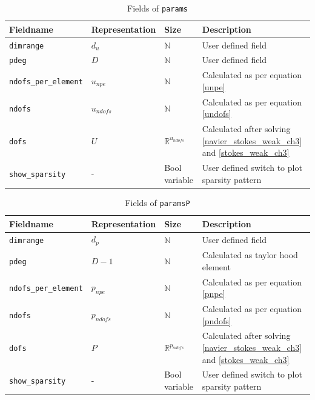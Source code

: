 \documentclass[a4paper,openany]{book}
\begin{document}
\begin{table}
\cprotect\caption{Fields of \verb|params|}
\label{table_params}
\begin{center}
\begin{tabular}{| p{}| p{} |  p{} | p{}|} 
\hline
\textbf{Fieldname} & \textbf{Representation} & \textbf{Size} & \textbf{Description}\\
\hline
\verb|dimrange| & $d_u$ & $\mathbb{N}$ & User defined field\\
\hline
\verb|pdeg| & $D$ & $\mathbb{N}$ & User defined field\\
\hline
\verb|ndofs_per_element| & $u_{npe}$ & $\mathbb{N}$ & Calculated as per equation \ref{unpe}\\
\hline
\verb|ndofs| & $u_{ndofs}$ & $\mathbb{N}$ & Calculated as per equation \ref{undofs}\\
\hline
\verb|dofs| & $U$ & $\mathbb{R}^{u_{ndofs}}$ & Calculated after solving \ref{navier_stokes_weak_ch3} and \ref{stokes_weak_ch3}\\
\hline
\verb|show_sparsity| & - & Bool variable & User defined switch to plot sparsity pattern\\
\hline
\end{tabular}
\end{center}
\end{table}

\begin{table}
\cprotect\caption{Fields of \verb|paramsP|}
\label{table_paramsP}
\begin{center}
\begin{tabular}{| p{}| p{} |  p{} | p{}|}
\hline
\textbf{Fieldname} & \textbf{Representation} & \textbf{Size} & \textbf{Description}\\
\hline
\verb|dimrange| & $d_p$ & $\mathbb{N}$ & User defined field\\
\hline
\verb|pdeg| & $D-1$ & $\mathbb{N}$ & Calculated as taylor hood element\\
\hline
\verb|ndofs_per_element| & $p_{npe}$ & $\mathbb{N}$ & Calculated as per equation \ref{pnpe}\\
\hline
\verb|ndofs| & $p_{ndofs}$ & $\mathbb{N}$ & Calculated as per equation \ref{pndofs}\\
\hline
\verb|dofs| & $P$ & $\mathbb{R}^{p_{ndofs}}$ & Calculated after solving \ref{navier_stokes_weak_ch3} and \ref{stokes_weak_ch3}\\
\hline
\verb|show_sparsity| & - & Bool variable & User defined switch to plot sparsity pattern\\
\hline
\end{tabular}
\end{center}
\end{table}
\end{document}
